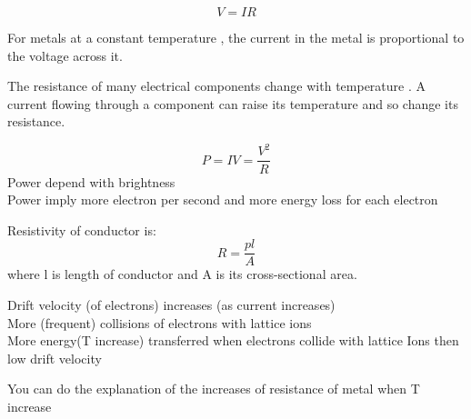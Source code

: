 \documentclass[a4paper]{article}
\begin{document}
\begin{defi}[Resistance]
\begin{equation*}
    V=IR
\end{equation*}
\end{defi}

\begin{law}
For metals at a constant temperature , the current in the metal is proportional to the voltage across it.
\end{law}

\begin{defi}
The resistance of many electrical components change with temperature . A current flowing through a component can raise its temperature and so change its resistance.
\end{defi}

\begin{defi}[Metal]

\end{defi}
\begin{defi}[Semiconductors]

\end{defi}
\begin{defi}[Power]
\begin{equation*}
    P=IV=\frac{V^2}{R}
\end{equation*}
Power depend with brightness\\

Power imply more electron per second and more energy loss for each electron
\end{defi}
\begin{defi}

\end{defi}
\begin{defi}[Resistivity]
Resistivity of conductor is:
\begin{equation*}
    R=\frac{pl}{A}
\end{equation*}
where l is length of conductor and A is its cross-sectional area.
\end{defi}

\begin{defi}
Drift velocity (of electrons) increases (as current increases)\\
More (frequent) collisions of electrons with lattice ions\\
More energy(T increase) transferred when electrons collide with lattice Ions then low drift velocity
\end{defi}
You can do the explanation of the increases of resistance of metal when T increase
\end{document}
